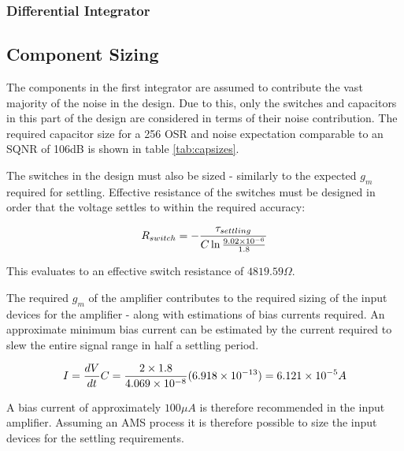         \subsubsection{Differential Integrator}



    \subsection{Component Sizing}
    \label{Design:components}
    The components in the first integrator are assumed to contribute the vast majority of the noise in the design.
    Due to this, only the switches and capacitors in this part of the design are considered in terms of their noise contribution.
    The required capacitor size for a 256 OSR and noise expectation comparable to an SQNR of 106dB is shown in table \ref{tab:capsizes}.

    The switches in the design must also be sized - similarly to the expected $g_{m}$ required for settling.
    Effective resistance of the switches must be designed in order that the voltage settles to within the required accuracy:   

    \begin{align}
        R_{switch}  = -\frac{\tau_{settling}}{C \ln{\frac{9.02\ensuremath{\times 10^{-6}}}{1.8}}}
    \end{align}

    This evaluates to an effective switch resistance of $4819.59\Omega$.

    The required $g_{m}$ of the amplifier contributes to the required sizing of the input devices for the amplifier - along with estimations of bias currents required.
    An approximate minimum bias current can be estimated by the current required to slew the entire signal range in half a settling period.
    
    \begin{align}
        I = \frac{dV}{dt}C = \frac{2\times 1.8}{4.069\times 10^{-8}}(6.918\times 10^{-13}) = 6.121\times 10^{-5} A
    \end{align}
    
    A bias current of approximately $100\mu A$ is therefore recommended in the input amplifier.
    Assuming an AMS process it is therefore possible to size the input devices for the settling requirements.
    
